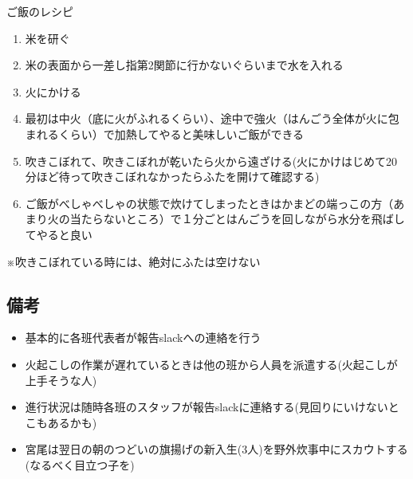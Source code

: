\begin{itembox}[l]{ご飯のレシピ}
  \begin{enumerate}
    \item 米を研ぐ
    \item 米の表面から一差し指第2関節に行かないぐらいまで水を入れる
    \item 火にかける

    \item 最初は中火（底に火がふれるくらい）、途中で強火（はんごう全体が火に包まれるくらい）で加熱してやると美味しいご飯ができる
    \item 吹きこぼれて、吹きこぼれが乾いたら火から遠ざける(火にかけはじめて20分ほど待って吹きこぼれなかったらふたを開けて確認する)
    \item ご飯がべしゃべしゃの状態で炊けてしまったときはかまどの端っこの方（あまり火の当たらないところ）で１分ごとはんごうを回しながら水分を飛ばしてやると良い
  \end{enumerate}
※吹きこぼれている時には、絶対にふたは空けない
\end{itembox}


\subsection{備考}
\begin{itemize}
\item 基本的に各班代表者が報告slackへの連絡を行う
\item 火起こしの作業が遅れているときは他の班から人員を派遣する(火起こしが上手そうな人)
\item 進行状況は随時各班のスタッフが報告slackに連絡する(見回りにいけないとこもあるかも)
\item 宮尾は翌日の朝のつどいの旗揚げの新入生(3人)を野外炊事中にスカウトする(なるべく目立つ子を)
\end{itemize}


%
